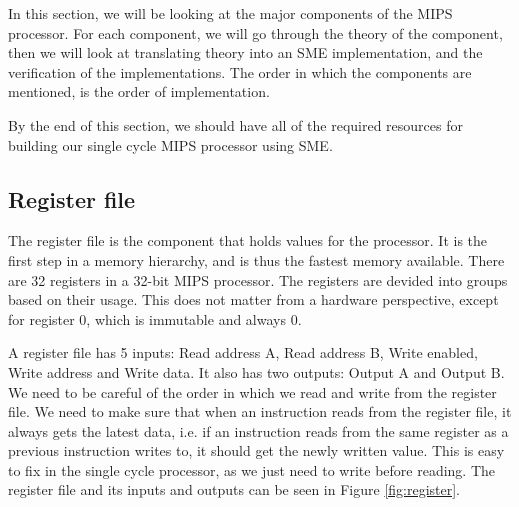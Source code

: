 In this section, we will be looking at the major components of the MIPS
processor. For each component, we will go through the theory of the component,
then we will look at translating theory into an SME implementation, and the
verification of the implementations. The order in which the components are
mentioned, is the order of implementation.

By the end of this section, we should have all of the required resources for
building our single cycle MIPS processor using SME.

\subsection{Register file}
The register file is the component that holds values for the processor. It is
the first step in a memory hierarchy, and is thus the fastest memory available.
There are 32 registers in a 32-bit MIPS processor. The registers are devided
into groups based on their usage. This does not matter from a hardware
perspective, except for register 0, which is immutable and always 0.

A register file has 5 inputs: Read address A, Read address B, Write enabled,
Write address and Write data. It also has two outputs: Output A and Output B.
We need to be careful of the order in which we read and write from the register
file. We need to make sure that when an instruction reads from the register
file, it always gets the latest data, i.e. if an instruction reads from the
same register as a previous instruction writes to, it should get the newly
written value. This is easy to fix in the single cycle processor, as we just
need to write before reading. The register file and its inputs and outputs can
be seen in Figure \ref{fig:register}.

